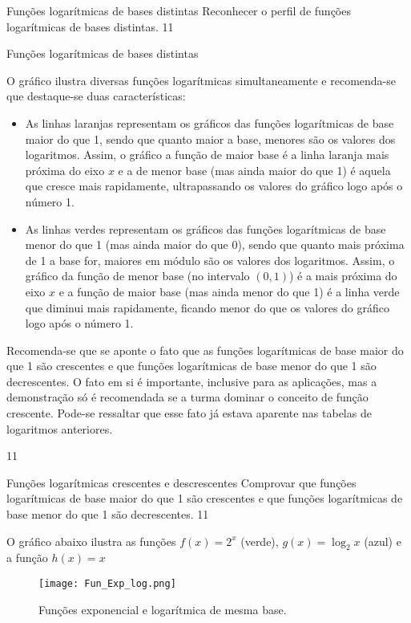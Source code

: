 \clearmargin
\begin{objectives}{Funções logarítmicas de bases distintas}
{
	Reconhecer o perfil de funções logarítmicas de bases distintas.
}{1}{1}
\end{objectives}
\begin{sugestions}{Funções logarítmicas de bases distintas}
{
	O gráfico ilustra diversas funções logarítmicas simultaneamente e recomenda-se que destaque-se duas características:
	\begin{itemize}
	\item As linhas laranjas representam os gráficos das funções logarítmicas de base maior do que 1, sendo que quanto maior a base, menores são os valores dos logaritmos. Assim, o gráfico a função de maior base é a linha laranja mais próxima do eixo $x$ e a de menor base (mas ainda maior do que 1) é aquela que cresce mais rapidamente, ultrapassando os valores do gráfico logo após o número 1.
	\item As linhas verdes representam os gráficos das funções logarítmicas de base menor do que 1 (mas ainda maior do que 0), sendo que quanto mais próxima de 1 a base for, maiores em módulo são os valores dos logaritmos. Assim, o gráfico da função de menor base (no intervalo $(0,1)$) é a mais próxima do eixo $x$ e a função de maior base (mas ainda menor do que 1) é a linha verde que diminui mais rapidamente, ficando menor do que os valores do gráfico logo após o número 1.
	\end{itemize}
	Recomenda-se que se aponte o fato que as funções logarítmicas de base maior do que 1 são crescentes e que funções logarítmicas de base menor do que 1 são decrescentes. O fato em si é importante, inclusive para as aplicações, mas a demonstração só é recomendada se a turma dominar o conceito de função crescente. Pode-se ressaltar que esse fato já estava aparente nas tabelas de logaritmos anteriores.
}{1}{1}
\end{sugestions}
\begin{objectives}{Funções logarítmicas crescentes e descrescentes}
{
	Comprovar que funções logarítmicas de base maior do que 1 são crescentes e que funções logarítmicas de base menor do que 1 são decrescentes.
}{1}{1}
\end{objectives}



O gráfico abaixo ilustra as funções $f(x)=2^x$ (verde), $g(x)=\log_2 x$ (azul) e a função $h(x)=x$

\begin{figure}[H]
\centering

\texttt{[image: Fun\_Exp\_log.png]}
\caption{Funções exponencial e logarítmica de mesma base.}

\end{figure}


